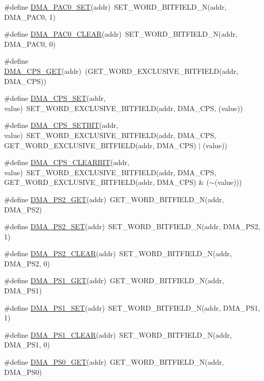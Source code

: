 \begin{DoxyCompactItemize}
\item 
\#define \hyperlink{a00548_a809f1a41769df621b9bf85118417aead}{DMA\_\-PAC0\_\-SET}(addr)~SET\_\-WORD\_\-BITFIELD\_\-N(addr, DMA\_\-PAC0, 1)
\item 
\#define \hyperlink{a00548_a93fe244c6a0c9ef73aa92a36be2c748c}{DMA\_\-PAC0\_\-CLEAR}(addr)~SET\_\-WORD\_\-BITFIELD\_\-N(addr, DMA\_\-PAC0, 0)
\item 
\#define \hyperlink{a00548_a169ed308c36229f24441a8614cbbc2cf}{DMA\_\-CPS\_\-GET}(addr)~(GET\_\-WORD\_\-EXCLUSIVE\_\-BITFIELD(addr, DMA\_\-CPS))
\item 
\#define \hyperlink{a00548_a744373977e8cbcc6d5263f50e1fe7f42}{DMA\_\-CPS\_\-SET}(addr, value)~SET\_\-WORD\_\-EXCLUSIVE\_\-BITFIELD(addr, DMA\_\-CPS, (value))
\item 
\#define \hyperlink{a00548_ac64cdaf9695273a449900f061ce289a7}{DMA\_\-CPS\_\-SETBIT}(addr, value)~SET\_\-WORD\_\-EXCLUSIVE\_\-BITFIELD(addr, DMA\_\-CPS, GET\_\-WORD\_\-EXCLUSIVE\_\-BITFIELD(addr, DMA\_\-CPS) $|$ (value))
\item 
\#define \hyperlink{a00548_a79f22b64e8b8e5ecd11360619e9ad26c}{DMA\_\-CPS\_\-CLEARBIT}(addr, value)~SET\_\-WORD\_\-EXCLUSIVE\_\-BITFIELD(addr, DMA\_\-CPS, GET\_\-WORD\_\-EXCLUSIVE\_\-BITFIELD(addr, DMA\_\-CPS) \& ($\sim$(value)))
\item 
\#define \hyperlink{a00548_a7abbeae1bdf88c7d2d4802063647bf13}{DMA\_\-PS2\_\-GET}(addr)~GET\_\-WORD\_\-BITFIELD\_\-N(addr, DMA\_\-PS2)
\item 
\#define \hyperlink{a00548_abf0646f81e1da097e411ca4953db96f3}{DMA\_\-PS2\_\-SET}(addr)~SET\_\-WORD\_\-BITFIELD\_\-N(addr, DMA\_\-PS2, 1)
\item 
\#define \hyperlink{a00548_a32b673c4554064d6b42ec9d796422b7d}{DMA\_\-PS2\_\-CLEAR}(addr)~SET\_\-WORD\_\-BITFIELD\_\-N(addr, DMA\_\-PS2, 0)
\item 
\#define \hyperlink{a00548_a9ecfcd0fb0dccbc2574cc7560fd10ded}{DMA\_\-PS1\_\-GET}(addr)~GET\_\-WORD\_\-BITFIELD\_\-N(addr, DMA\_\-PS1)
\item 
\#define \hyperlink{a00548_aa66a4e7b7029da48f273ce578b9daf70}{DMA\_\-PS1\_\-SET}(addr)~SET\_\-WORD\_\-BITFIELD\_\-N(addr, DMA\_\-PS1, 1)
\item 
\#define \hyperlink{a00548_acf18b684a19a037c1120f7e2860ed7ab}{DMA\_\-PS1\_\-CLEAR}(addr)~SET\_\-WORD\_\-BITFIELD\_\-N(addr, DMA\_\-PS1, 0)
\item 
\#define \hyperlink{a00548_a1a2f592c3d02ac5355fd65baf03c8176}{DMA\_\-PS0\_\-GET}(addr)~GET\_\-WORD\_\-BITFIELD\_\-N(addr, DMA\_\-PS0)
\item 

\end{DoxyCompactItemize}
